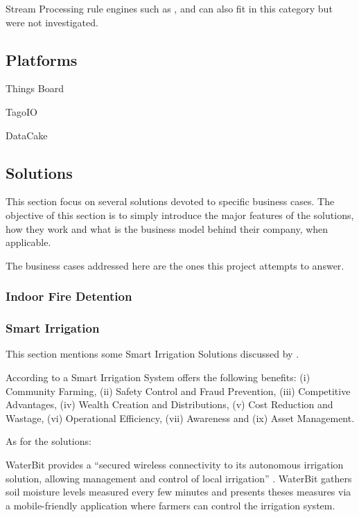 Stream Processing rule engines such as \cite{storm}, \cite{spark} and \cite{flink} can also fit in this category but were not investigated.

\subsection{Platforms}
\label{subsec:stateofart:arch:platforms}

Things Board

TagoIO

DataCake

\subsection{Solutions}
\label{subsec:stateofart:arch:solutions}

This section focus on several solutions devoted to specific business cases.
The objective of this section is to simply introduce the major features of the solutions, how they work and what is the business model behind their company, when applicable.

The business cases addressed here are the ones this project attempts to answer.

\subsubsection{Indoor Fire Detention}
\label{subsubsec:stateofart:arch:solutions:fire}

\subsubsection{Smart Irrigation}
\label{subsubsec:stateofart:arch:solutions:irrigation}

This section mentions some Smart Irrigation Solutions discussed by \cite{OBAIDEEN2022100124}.

According to \cite{8372905} a Smart Irrigation System offers the following benefits: (i) Community Farming, (ii) Safety Control and Fraud Prevention, (iii) Competitive Advantages, (iv) Wealth Creation and Distributions, (v) Cost Reduction and Wastage, (vi) Operational Efficiency, (vii) Awareness and (ix) Asset Management.

As for the solutions:

WaterBit provides a ``secured wireless connectivity to its autonomous irrigation solution, allowing management and control of local irrigation'' \parencite{OBAIDEEN2022100124}. WaterBit gathers soil moisture levels measured every few minutes and presents theses measures via a mobile-friendly application where farmers can control the irrigation system.

